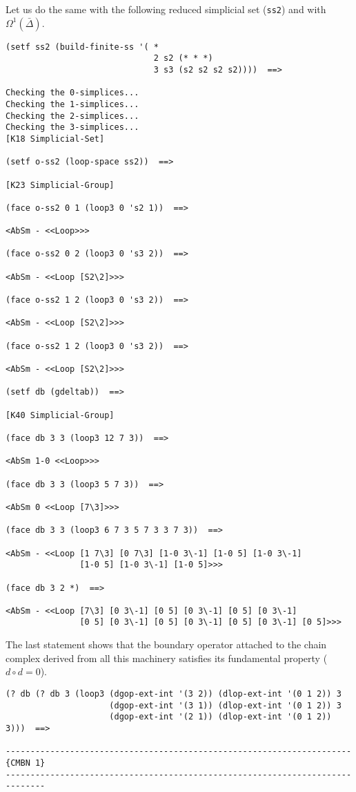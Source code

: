 Let us do the same with the following reduced simplicial set ({\tt ss2}) and with $\Omega^1(\bar{\Delta})$.
{\footnotesize\begin{verbatim}
(setf ss2 (build-finite-ss '( *
                              2 s2 (* * *)
                              3 s3 (s2 s2 s2 s2))))  ==>

Checking the 0-simplices...
Checking the 1-simplices...
Checking the 2-simplices...
Checking the 3-simplices...
[K18 Simplicial-Set]

(setf o-ss2 (loop-space ss2))  ==>

[K23 Simplicial-Group]

(face o-ss2 0 1 (loop3 0 's2 1))  ==>

<AbSm - <<Loop>>>

(face o-ss2 0 2 (loop3 0 's3 2))  ==>

<AbSm - <<Loop [S2\2]>>>

(face o-ss2 1 2 (loop3 0 's3 2))  ==>

<AbSm - <<Loop [S2\2]>>>

(face o-ss2 1 2 (loop3 0 's3 2))  ==>

<AbSm - <<Loop [S2\2]>>>

(setf db (gdeltab))  ==>

[K40 Simplicial-Group]

(face db 3 3 (loop3 12 7 3))  ==>

<AbSm 1-0 <<Loop>>>

(face db 3 3 (loop3 5 7 3))  ==>

<AbSm 0 <<Loop [7\3]>>>

(face db 3 3 (loop3 6 7 3 5 7 3 3 7 3))  ==>

<AbSm - <<Loop [1 7\3] [0 7\3] [1-0 3\-1] [1-0 5] [1-0 3\-1]
               [1-0 5] [1-0 3\-1] [1-0 5]>>>

(face db 3 2 *)  ==>

<AbSm - <<Loop [7\3] [0 3\-1] [0 5] [0 3\-1] [0 5] [0 3\-1]
               [0 5] [0 3\-1] [0 5] [0 3\-1] [0 5] [0 3\-1] [0 5]>>>
\end{verbatim}}
The last  statement shows that the boundary operator attached to
the chain complex derived from all this machinery satisfies its fundamental
property ($d\circ d=0$).
{\footnotesize\begin{verbatim}
(? db (? db 3 (loop3 (dgop-ext-int '(3 2)) (dlop-ext-int '(0 1 2)) 3
                     (dgop-ext-int '(3 1)) (dlop-ext-int '(0 1 2)) 3
                     (dgop-ext-int '(2 1)) (dlop-ext-int '(0 1 2)) 3)))  ==>

----------------------------------------------------------------------{CMBN 1}
------------------------------------------------------------------------------
\end{verbatim}}
